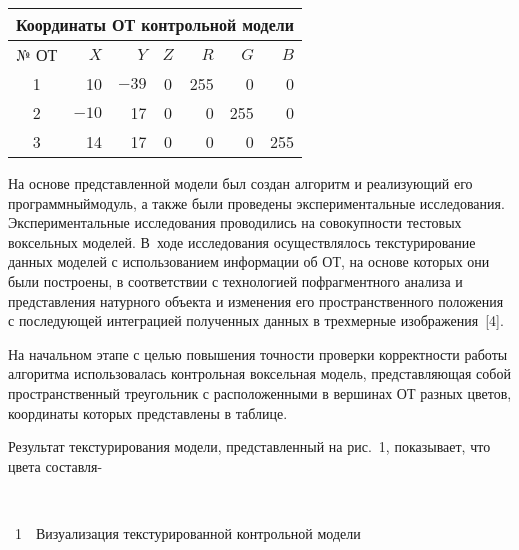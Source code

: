 \begin{multicols}{2}
{\small \begin{center}
\begin{tabular}{|c|r|r|c|r|r|r|}
\multicolumn{7}{c}{Координаты ОТ контрольной модели}\\[6pt]
\hline
№ ОТ&$X$&$Y$&$Z$&$R$&$G$&$B$\\
\hline
1&10&$-39$&0&255&0&0\\
2&$-10$&17&0&0&255&0\\
3&14&17&0&0&0&255\\
\hline
\end{tabular}
\end{center}
}

\vspace*{9pt}

  На основе представленной модели был создан алгоритм и реализующий
его программный\linebreak модуль, а также были проведены экспериментальные
исследования. Экспериментальные исследования про\-водились на
совокупности тестовых воксель\-ных моделей. В~ходе исследования
осуществлялось текстурирование данных моделей с использованием
информации об ОТ, на основе которых они были построены, в
соответствии с технологией пофрагментного анализа и представления
натурного объекта и изменения его пространственного положения с
последующей интеграцией полученных данных в трехмерные
изображения~[4].

  На начальном этапе с целью повышения точности проверки корректности
работы алгоритма использовалась контрольная воксельная модель,
представляющая собой пространственный треугольник с расположенными в
вершинах ОТ разных цветов, координаты которых представлены в таблице.




  Результат текстурирования модели, пред\-став\-лен\-ный на рис.~1, показывает,
что цвета составля-\linebreak

\vspace*{3pt}

\noindent
\begin{center}  %
\mbox{%
\epsfxsize=60mm %
}
  \end{center}


\noindent
{{\figurename~1}\ \ \small{Визуализация текстурированной контрольной модели}}



\addtocounter{figure}{1}

\end{multicols}

